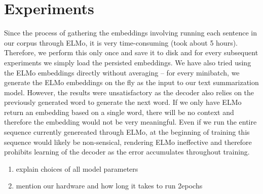 \section{Experiments}
\label{sec: exp}

Since the process of gathering the embeddings involving running each sentence in our corpus through ELMo, it is very time-consuming (took about 5 hours). Therefore, we perform this only once and save it to disk and for every subsequent experiments we simply load the persisted embeddings. We have also tried using the ELMo embeddings directly without averaging -- for every minibatch, we generate the ELMo embeddings on the fly as the input to our text summarization model. However, the results were unsatisfactory as the decoder also relies on the previously generated word to generate the next word. If we only have ELMo return an embedding based on a single word, there will be no context and therefore the embedding would not be very meaningful. Even if we run the entire sequence currently genereated through ELMo, at the beginning of training this sequence would likely be non-sensical, rendering ELMo ineffective and therefore prohibits learning of the decoder as the error accumulates throughout training.


\begin{enumerate}
\item explain choices of all model parameters
\item mention our hardware and how long it takes to run 2epochs
\end{enumerate}

